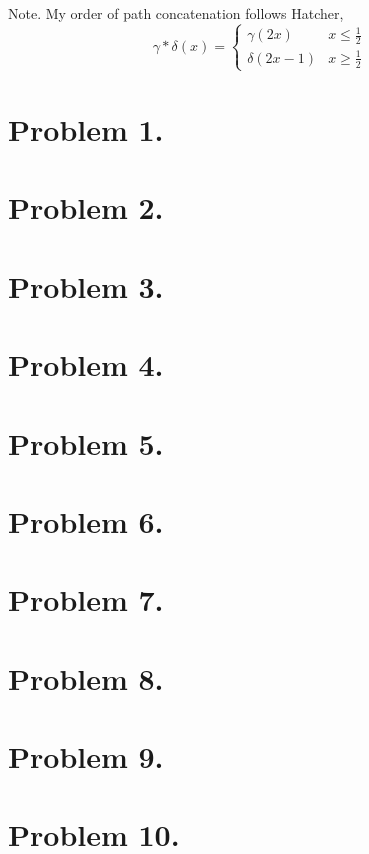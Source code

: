 \documentclass[12pt]{extarticle}
\begin{document}
Note. My order of path concatenation follows Hatcher,
\[\gamma * \delta(x) = \begin{cases}
\gamma(2x) & x \le \tfrac{1}{2} \\
\delta(2x - 1) & x \ge \tfrac{1}{2}
\end{cases}\]
 
\section*{Problem 1.}

\section*{Problem 2.}

\section*{Problem 3.}

\section*{Problem 4.}

\section*{Problem 5.}

\section*{Problem 6.}

\section*{Problem 7.}

\section*{Problem 8.}

\section*{Problem 9.}

\section*{Problem 10.}
\end{document}
